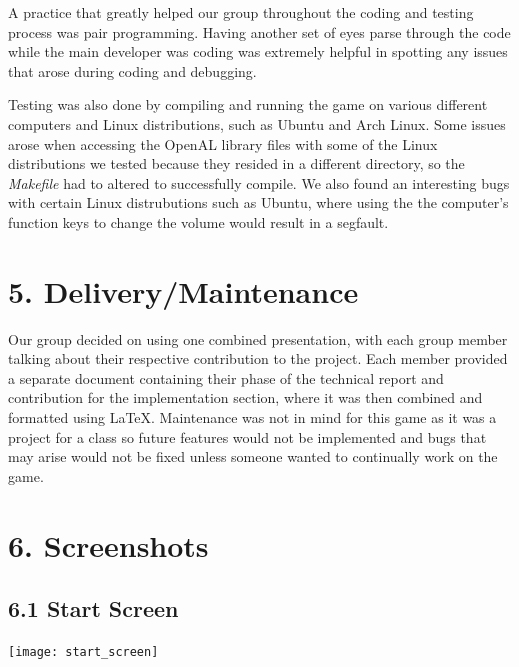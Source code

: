 \documentclass[12pt]{report}
\begin{document}
A practice that greatly helped our group throughout the coding and testing process was pair programming. Having another set of eyes parse through the code while the main developer was coding was extremely helpful in spotting any issues that arose during coding and debugging. \bigskip

Testing was also done by compiling and running the game on various different computers and Linux distributions, such as Ubuntu and Arch Linux. Some issues arose when accessing the OpenAL library files with some of the Linux distributions we tested because they resided in a different directory, so the \textit{Makefile} had to altered to successfully compile. We also found an interesting bugs with certain Linux distrubutions such as Ubuntu, where using the the computer's function keys to change the volume would result in a segfault.

\newpage
\section*{5. Delivery/Maintenance}
Our group decided on using one combined presentation, with each group member talking about their respective contribution to the project. Each member provided a separate document containing their phase of the technical report and contribution for the implementation section, where it was then combined and formatted using LaTeX. Maintenance was not in mind for this game as it was a project for a class so future features would not be implemented and bugs that may arise would not be fixed unless someone wanted to continually work on the game.

\newpage
\section*{6. Screenshots}

\subsection*{6.1 Start Screen}
\texttt{[image: start\_screen]}
\end{document}
